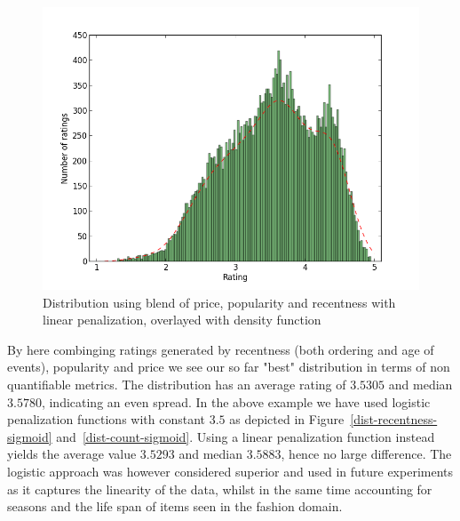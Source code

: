 \begin{figure}[H]
  \centering
  \label{dist-blend-price}
  \includegraphics[scale=0.5]{image/dist-blend-price-popularity-recentness}
  \caption{Distribution using blend of price, popularity and recentness with
  linear penalization, overlayed with density function}
\end{figure}

By here combinging ratings generated by recentness (both ordering and age of
events), popularity and price we see our so far "best" distribution in terms of
non quantifiable metrics. The distribution has an average rating of $3.5305$
and median $3.5780$, indicating an even spread. In the above example we have
used logistic penalization functions with constant $3.5$ as depicted in
Figure~\ref{dist-recentness-sigmoid} and~\ref{dist-count-sigmoid}. Using a
linear penalization function instead yields the average value $3.5293$ and
median $3.5883$, hence no large difference. The logistic approach was however
considered superior and used in future experiments as it captures the linearity
of the data, whilst in the same time accounting for seasons and the life span
of items seen in the fashion domain.


